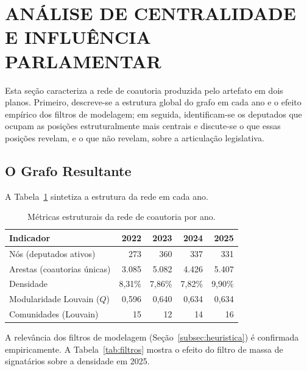 \documentclass[
      12pt,
      a4paper,
      openright,
      oneside,
      chapter=TITLE,
      section=TITLE,
      english,
      french,
      spanish,
      brazilian
    ]{abntex2}
\begin{document}
    \section{ANÁLISE DE CENTRALIDADE E INFLUÊNCIA PARLAMENTAR}

    Esta seção caracteriza a rede de coautoria produzida pelo artefato em dois planos. Primeiro, descreve-se a estrutura global do grafo em cada ano e o efeito empírico dos filtros de modelagem; em seguida, identificam-se os deputados que ocupam as posições estruturalmente mais centrais e discute-se o que essas posições revelam, e o que não revelam, sobre a articulação legislativa.

    \subsection{O Grafo Resultante}
    
    A Tabela~\ref{tab:metricas_rede} sintetiza a estrutura da rede em cada ano.
    
    \begin{table}[H]
    \centering
    \caption{Métricas estruturais da rede de coautoria por ano.}
    \label{tab:metricas_rede}
    \begin{tabular}{lrrrr}
    \toprule
    \textbf{Indicador} & \textbf{2022} & \textbf{2023} & \textbf{2024} & \textbf{2025} \\
    \midrule
    Nós (deputados ativos)       & 273   & 360   & 337   & 331   \\
    Arestas (coautorias únicas)  & 3.085 & 5.082 & 4.426 & 5.407 \\
    Densidade                    & 8,31\% & 7,86\% & 7,82\% & 9,90\% \\
    Modularidade Louvain ($Q$)   & 0,596 & 0,640 & 0,634 & 0,634 \\
    Comunidades (Louvain)        & 15    & 12    & 14    & 16    \\
    \bottomrule
    \end{tabular}
    \end{table}
    
    A relevância dos filtros de modelagem (Seção~\ref{subsec:heuristica}) é confirmada empiricamente. A Tabela~\ref{tab:filtros} mostra o efeito do filtro de massa de signatários sobre a densidade em 2025.
    
\end{document}

